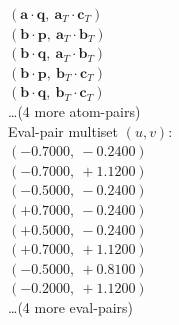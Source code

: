\documentclass[a4paper,11pt]{article}
\newcommand{\pdcegfomjfhook}[2]{\mathbf{#1} \cdot \mathbf{#2}}
\newcommand{\fpbeomcfokjooi}[2]{\mathbf{#1}_T \cdot \mathbf{#2}_T}
\begin{document}
$(\pdcegfomjfhook{a}{q},\ \fpbeomcfokjooi{a}{c})$\\
$(\pdcegfomjfhook{b}{p},\ \fpbeomcfokjooi{a}{b})$\\
$(\pdcegfomjfhook{b}{q},\ \fpbeomcfokjooi{a}{b})$\\
$(\pdcegfomjfhook{b}{p},\ \fpbeomcfokjooi{b}{c})$\\
$(\pdcegfomjfhook{b}{q},\ \fpbeomcfokjooi{b}{c})$\\
\quad \ldots (4 more atom-pairs)\\
\quad Eval-pair multiset $(u, v)$:\\
$(-0.7000,\ -0.2400)$\\
$(-0.7000,\ +1.1200)$\\
$(-0.5000,\ -0.2400)$\\
$(+0.7000,\ -0.2400)$\\
$(+0.5000,\ -0.2400)$\\
$(+0.7000,\ +1.1200)$\\
$(-0.5000,\ +0.8100)$\\
$(-0.2000,\ +1.1200)$\\
\quad \ldots (4 more eval-pairs)\\
\end{document}
